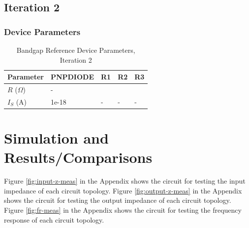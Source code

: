 \documentclass[conference]{IEEEtran}
\begin{document}
\subsection{Iteration 2}
	\subsubsection{Device Parameters}
\begin{table}[!htbp]
  \caption[]{Bandgap Reference Device Parameters, Iteration 2}
  \label{tab:bg-dp-2}
  \centering
  \begin{tabular}{|l|l|l|l|l|}
    \hline
    Parameter			& PNPDIODE	&R1 &R2	&R3 \\ \hline
    $R$ ($\Omega$)		&-		&	&	&\\ \hline
    $I_S$ (A)		&1e-18		&-	&-	&-\\
    \hline
  \end{tabular}
\end{table}

\onecolumn
\section{Simulation and Results/Comparisons}
Figure \ref{fig:input-z-meas} in the Appendix shows the circuit for testing the input impedance of each circuit topology.  Figure \ref{fig:output-z-meas} in the Appendix shows the circuit for testing the output impedance of each circuit topology.  Figure \ref{fig:fr-meas} in the Appendix shows the circuit for testing the frequency response of each circuit topology.\\
\end{document}
